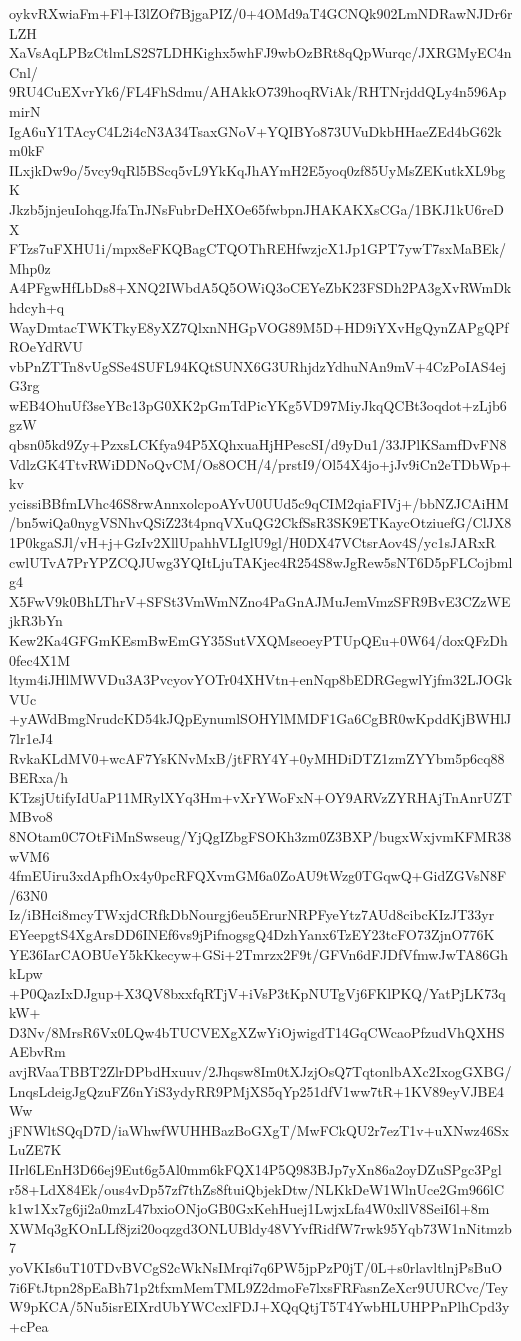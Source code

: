oykvRXwiaFm+Fl+I3lZOf7BjgaPIZ/0+4OMd9aT4GCNQk902LmNDRawNJDr6rLZH
XaVsAqLPBzCtlmLS2S7LDHKighx5whFJ9wbOzBRt8qQpWurqc/JXRGMyEC4nCnl/
9RU4CuEXvrYk6/FL4FhSdmu/AHAkkO739hoqRViAk/RHTNrjddQLy4n596ApmirN
IgA6uY1TAcyC4L2i4cN3A34TsaxGNoV+YQIBYo873UVuDkbHHaeZEd4bG62km0kF
ILxjkDw9o/5vcy9qRl5BScq5vL9YkKqJhAYmH2E5yoq0zf85UyMsZEKutkXL9bgK
Jkzb5jnjeuIohqgJfaTnJNsFubrDeHXOe65fwbpnJHAKAKXsCGa/1BKJ1kU6reDX
FTzs7uFXHU1i/mpx8eFKQBagCTQOThREHfwzjcX1Jp1GPT7ywT7sxMaBEk/Mhp0z
A4PFgwHfLbDs8+XNQ2IWbdA5Q5OWiQ3oCEYeZbK23FSDh2PA3gXvRWmDkhdcyh+q
WayDmtacTWKTkyE8yXZ7QlxnNHGpVOG89M5D+HD9iYXvHgQynZAPgQPfROeYdRVU
vbPnZTTn8vUgSSe4SUFL94KQtSUNX6G3URhjdzYdhuNAn9mV+4CzPoIAS4ejG3rg
wEB4OhuUf3seYBc13pG0XK2pGmTdPicYKg5VD97MiyJkqQCBt3oqdot+zLjb6gzW
qbsn05kd9Zy+PzxsLCKfya94P5XQhxuaHjHPescSI/d9yDu1/33JPlKSamfDvFN8
VdlzGK4TtvRWiDDNoQvCM/Os8OCH/4/prstI9/Ol54X4jo+jJv9iCn2eTDbWp+kv
ycissiBBfmLVhc46S8rwAnnxolcpoAYvU0UUd5c9qCIM2qiaFIVj+/bbNZJCAiHM
/bn5wiQa0nygVSNhvQSiZ23t4pnqVXuQG2CkfSsR3SK9ETKaycOtziuefG/ClJX8
1P0kgaSJl/vH+j+GzIv2XllUpahhVLIglU9gl/H0DX47VCtsrAov4S/yc1sJARxR
cwlUTvA7PrYPZCQJUwg3YQItLjuTAKjec4R254S8wJgRew5sNT6D5pFLCojbmlg4
X5FwV9k0BhLThrV+SFSt3VmWmNZno4PaGnAJMuJemVmzSFR9BvE3CZzWEjkR3bYn
Kew2Ka4GFGmKEsmBwEmGY35SutVXQMseoeyPTUpQEu+0W64/doxQFzDh0fec4X1M
ltym4iJHlMWVDu3A3PvcyovYOTr04XHVtn+enNqp8bEDRGegwlYjfm32LJOGkVUc
+yAWdBmgNrudcKD54kJQpEynumlSOHYlMMDF1Ga6CgBR0wKpddKjBWHlJ7lr1eJ4
RvkaKLdMV0+wcAF7YsKNvMxB/jtFRY4Y+0yMHDiDTZ1zmZYYbm5p6cq88BERxa/h
KTzsjUtifyIdUaP11MRylXYq3Hm+vXrYWoFxN+OY9ARVzZYRHAjTnAnrUZTMBvo8
8NOtam0C7OtFiMnSwseug/YjQgIZbgFSOKh3zm0Z3BXP/bugxWxjvmKFMR38wVM6
4fmEUiru3xdApfhOx4y0pcRFQXvmGM6a0ZoAU9tWzg0TGqwQ+GidZGVsN8F/63N0
Iz/iBHci8mcyTWxjdCRfkDbNourgj6eu5ErurNRPFyeYtz7AUd8cibcKIzJT33yr
EYeepgtS4XgArsDD6INEf6vs9jPifnogsgQ4DzhYanx6TzEY23tcFO73ZjnO776K
YE36IarCAOBUeY5kKkecyw+GSi+2Tmrzx2F9t/GFVn6dFJDfVfmwJwTA86GhkLpw
+P0QazIxDJgup+X3QV8bxxfqRTjV+iVsP3tKpNUTgVj6FKlPKQ/YatPjLK73qkW+
D3Nv/8MrsR6Vx0LQw4bTUCVEXgXZwYiOjwigdT14GqCWcaoPfzudVhQXHSAEbvRm
avjRVaaTBBT2ZlrDPbdHxuuv/2Jhqsw8Im0tXJzjOsQ7TqtonlbAXc2IxogGXBG/
LnqsLdeigJgQzuFZ6nYiS3ydyRR9PMjXS5qYp251dfV1ww7tR+1KV89eyVJBE4Ww
jFNWltSQqD7D/iaWhwfWUHHBazBoGXgT/MwFCkQU2r7ezT1v+uXNwz46SxLuZE7K
IIrl6LEnH3D66ej9Eut6g5Al0mm6kFQX14P5Q983BJp7yXn86a2oyDZuSPgc3Pgl
r58+LdX84Ek/ous4vDp57zf7thZs8ftuiQbjekDtw/NLKkDeW1WlnUce2Gm966lC
k1w1Xx7g6ji2a0mzL47bxioONjoGB0GxKehHuej1LwjxLfa4W0xllV8SeiI6l+8m
XWMq3gKOnLLf8jzi20oqzgd3ONLUBldy48VYvfRidfW7rwk95Yqb73W1nNitmzb7
yoVKIs6uT10TDvBVCgS2cWkNsIMrqi7q6PW5jpPzP0jT/0L+s0rlavltlnjPsBuO
7i6FtJtpn28pEaBh71p2tfxmMemTML9Z2dmoFe7lxsFRFasnZeXcr9UURCvc/Tey
W9pKCA/5Nu5isrEIXrdUbYWCcxlFDJ+XQqQtjT5T4YwbHLUHPPnPlhCpd3y+cPea
